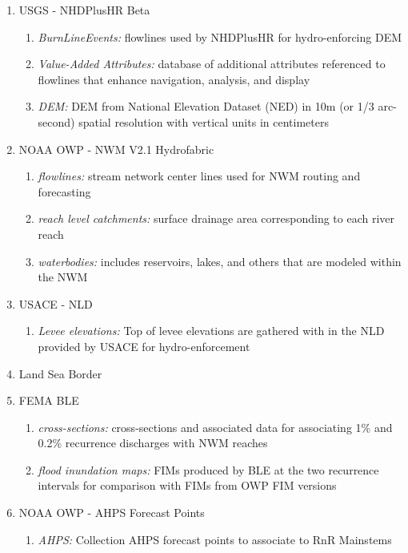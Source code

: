 \begin{enumerate}
\item{USGS - NHDPlusHR Beta}
    \begin{enumerate}
    \item{\textit{BurnLineEvents:} flowlines used by NHDPlusHR for hydro-enforcing DEM}
    \item{\textit{Value-Added Attributes:} database of additional attributes referenced to flowlines that enhance navigation, analysis, and display}
    \item{\textit{DEM:} DEM from National Elevation Dataset (NED) in 10m (or 1/3 arc-second) spatial resolution with vertical units in centimeters \cite{gesch2002national}}
    \end{enumerate}
\item{NOAA OWP - NWM V2.1 Hydrofabric}
    \begin{enumerate}
    \item{\textit{flowlines:} stream network center lines used for NWM routing and forecasting}
    \item{\textit{reach level catchments:} surface drainage area corresponding to each river reach}
    \item{\textit{waterbodies:} includes reservoirs, lakes, and others that are modeled within the NWM}
    \end{enumerate}
\item{USACE - NLD}
    \begin{enumerate}
    \item{\textit{Levee elevations:} Top of levee elevations are gathered with in the NLD provided by USACE for hydro-enforcement}
    \end{enumerate}
\item{Land Sea Border}
\item{FEMA BLE}
    \begin{enumerate}
    \item{\textit{cross-sections:} cross-sections and associated data for associating 1\% and 0.2\% recurrence discharges with NWM reaches}
    \item{\textit{flood inundation maps:} FIMs produced by BLE at the two recurrence intervals for comparison with FIMs from OWP FIM versions}
    \end{enumerate}
\item{NOAA OWP - AHPS Forecast Points}
    \begin{enumerate}
    \item{\textit{AHPS:} Collection AHPS forecast points to associate to RnR Mainstems}
    \end{enumerate}
\end{enumerate}


